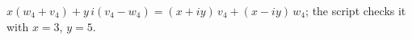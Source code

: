 $x(w_{4} + v_{4}) + y\,i(v_{4} - w_{4}) = (x + iy)\,v_{4} + (x - iy)\,w_{4}$; the script checks it with $x = 3$, $y = 5$.

